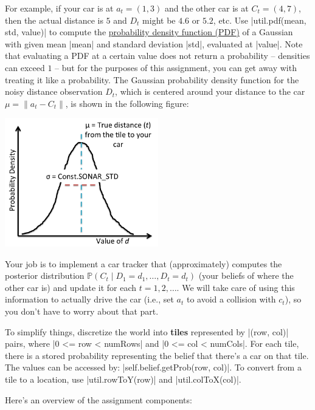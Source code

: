 For example, if your car is at $a_t = (1,3)$ and the other car is at $C_t =
(4,7)$, then the actual distance is $5$ and $D_t$ might be $4.6$ or $5.2$, etc.
Use |util.pdf(mean, std, value)| to compute the \href{http://en.wikipedia.org/wiki/Probability_density_function}{probability density function (PDF)} of a Gaussian
with given mean |mean| and standard deviation |std|, evaluated at |value|. Note
that evaluating a PDF at a certain value does not return a probability --
densities can exceed $1$ -- but for the purposes of this assignment, you can get
away with treating it like a probability. The Gaussian probability density
function for the noisy distance observation $D_t$, which is centered around your
distance to the car $\mu = \|a_t - C_t\|$, is shown in the following figure:
\begin{center}
\includegraphics[width=0.5\textwidth]{media/pdf.png}
\end{center}

Your job is to implement a car tracker that (approximately) computes the
posterior distribution $\mathbb P(C_t \mid D_1 = d_1, \dots, D_t = d_t)$ (your
beliefs of where the other car is) and update it for each $t = 1, 2, \dots$.  We
will take care of using this information to actually drive the car (i.e., set
$a_t$ to avoid a collision with $c_t$), so you don't have to worry about that
part.

To simplify things, discretize the world into {\bf tiles} represented by
|(row, col)| pairs, where |0 <= row < numRows| and |0 <= col < numCols|. For
each tile, there is a stored probability representing the belief that there's a car on
that tile. The values can be accessed by: |self.belief.getProb(row, col)|. To
convert from a tile to a location, use |util.rowToY(row)| and
|util.colToX(col)|.

Here's an overview of the assignment components:
  
